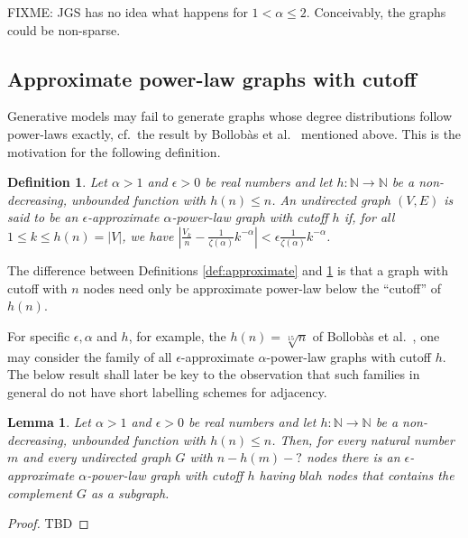 \documentclass{article}
\newtheorem{definition}{Definition}
\newtheorem{lemma}{Lemma}
\theoremstyle{remark}
\begin{document}
 FIXME: JGS has no idea what happens for $1 < \alpha \leq 2$. Conceivably, the graphs could be non-sparse.
 
 \subsection{Approximate power-law graphs with cutoff}

Generative models may fail to generate graphs whose degree distributions follow power-laws exactly,
cf.\ the result by Bollob{\`a}s et al.\ \cite{} mentioned above. This is the motivation for the following definition.

\begin{definition}\label{def:approximate_with_cutoff}
Let $\alpha > 1$ and $\epsilon > 0$ be real numbers and let $h : \mathbb{N} \longrightarrow \mathbb{N}$
be a non-decreasing, unbounded function with $h(n) \leq n$.
 An undirected graph $(V,E)$ is said to be an $\epsilon$-\emph{approximate} $\alpha$-\emph{power-law graph with cutoff} $h$
 if, for all $1 \leq k \leq h(n) = \vert V \vert$, we have $\left\vert \frac{V_k}{n} - \frac{1}{\zeta(\alpha)} k^{-\alpha} \right\vert < \epsilon \frac{1}{\zeta(\alpha)} k^{-\alpha}$.
\end{definition}

The difference between Definitions \ref{def:approximate} and \ref{def:approximate_with_cutoff} is that
a graph with cutoff with $n$ nodes need only be approximate power-law below the ``cutoff'' of $h(n)$.

For specific $\epsilon,\alpha$ and $h$, for example, the $h(n) = \sqrt[15]{n}$ of Bollob{\`a}s et al.\ \cite{}, one may consider the family of all $\epsilon$-approximate $\alpha$-power-law graphs with cutoff $h$. The below
result shall later be key to the observation that such families in general do not have short labelling schemes
for adjacency.

\begin{lemma}
Let $\alpha > 1$ and $\epsilon > 0$ be real numbers and let $h : \mathbb{N} \longrightarrow \mathbb{N}$
be a non-decreasing, unbounded function with $h(n) \leq n$. Then, for every natural number $m$ and every undirected graph $G$ with $n - h(m) - ?$ nodes there is an $\epsilon$-approximate $\alpha$-power-law graph with cutoff $h$ having $blah$ nodes that contains the complement $G$ as a subgraph.
\end{lemma}

\begin{proof}
TBD
\end{proof}
\end{document}
